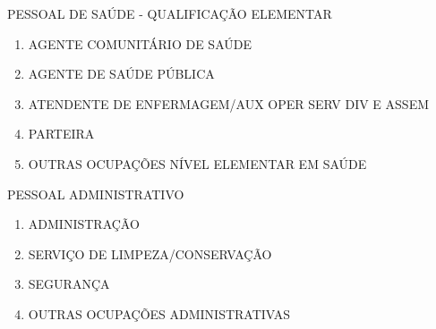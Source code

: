 \documentclass[a4paper,11pt]{article}
\begin{document}
PESSOAL DE SAÚDE - QUALIFICAÇÃO ELEMENTAR
\begin{enumerate}
    \item AGENTE COMUNITÁRIO DE SAÚDE
    \item AGENTE DE SAÚDE PÚBLICA
    \item ATENDENTE DE ENFERMAGEM/AUX OPER SERV DIV E ASSEM
    \item PARTEIRA
    \item OUTRAS OCUPAÇÕES NÍVEL ELEMENTAR EM SAÚDE
\end{enumerate}
PESSOAL ADMINISTRATIVO
\begin{enumerate}
    \item ADMINISTRAÇÃO
    \item SERVIÇO DE LIMPEZA/CONSERVAÇÃO
    \item SEGURANÇA
    \item OUTRAS OCUPAÇÕES ADMINISTRATIVAS
\end{enumerate}
\end{document}
